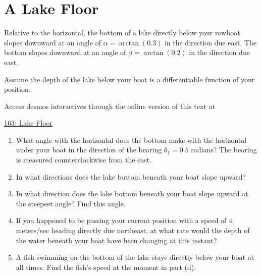 \documentclass{ximera}
\begin{document}
\section{A Lake Floor}

\begin{question} \label{Q761zd}
Relative to the horizontal, the bottom of a lake directly below your rowboat slopes downward at an angle of $\alpha=\arctan(0.3)$ in the direction due east. The bottom slopes  downward at an angle of $\beta=\arctan(0.2)$ in the direction due east.

Assume the depth of the lake below your boat is a differentiable function of your position.

\begin{onlineOnly}
    \begin{center}
\end{center}
\end{onlineOnly}

Access desmos interactives through the online version of this text at
 
\href{https://www.desmos.com/3d/16qfpy1rei}{163: Lake Floor}

\begin{enumerate}
\item What angle with the horizontal does the bottom make with the horizontal under your boat in the direction of the bearing $\theta_1 = 0.5$ radians? The bearing is measured counterclockwise from the east.

\item In what directions does the lake bottom beneath your boat slope upward?

\item In what direction does the lake bottom beneath your boat slope upward at the steepest angle? Find this angle.

\item If you happened to be passing your current position with a speed of $4$ meters/sec heading directly due northeast, at what rate would the depth of the water beneath your boat have been changing at this instant? 

\item A fish swimming on the bottom of the lake stays directly below your boat at all times. Find the fish's speed at the moment in part (d).
\end{enumerate}

\end{question}
\end{document}
